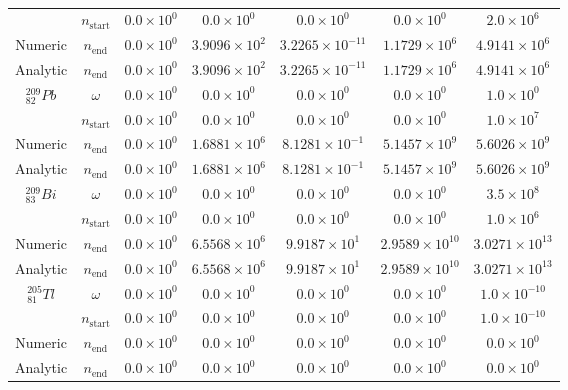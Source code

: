 \begin{table}[h]
\begin{center}
\begin{longtable}{c c c c c c c}
 & $n_{\text{start}}$ & 
${0.0} \times 10^{0}$ & ${0.0} \times 10^{0}$ & ${0.0} \times 10^{0}$ &
${0.0} \times 10^{0}$ & ${2.0} \times 10^{6}$ \\
Numeric & $n_{\text{end}}$ & 
${0.0} \times 10^{0}$ & ${3.9096} \times 10^{2}$ & ${3.2265} \times 10^{-11}$ & 
${1.1729} \times 10^{6}$ & ${4.9141} \times 10^{6}$ \\
Analytic & $n_{\text{end}}$ & 
${0.0} \times 10^{0}$ & ${3.9096} \times 10^{2}$ & ${3.2265} \times 10^{-11}$ & 
${1.1729} \times 10^{6}$ & ${4.9141} \times 10^{6}$ \\
\hline
${}^{209}_{82}Pb$ & $\omega$ & 
${0.0} \times 10^{0}$ & ${0.0} \times 10^{0}$ & ${0.0} \times 10^{0}$ &
${0.0} \times 10^{0}$ & ${1.0} \times 10^{0}$ \\
 & $n_{\text{start}}$ & 
${0.0} \times 10^{0}$ & ${0.0} \times 10^{0}$ & ${0.0} \times 10^{0}$ &
${0.0} \times 10^{0}$ & ${1.0} \times 10^{7}$ \\
Numeric & $n_{\text{end}}$ & 
${0.0} \times 10^{0}$ & ${1.6881} \times 10^{6}$ & ${8.1281} \times 10^{-1}$ & 
${5.1457} \times 10^{9}$ & ${5.6026} \times 10^{9}$ \\
Analytic & $n_{\text{end}}$ & 
${0.0} \times 10^{0}$ & ${1.6881} \times 10^{6}$ & ${8.1281} \times 10^{-1}$ & 
${5.1457} \times 10^{9}$ & ${5.6026} \times 10^{9}$ \\
\hline
${}^{209}_{83}Bi$ & $\omega$ & 
${0.0} \times 10^{0}$ & ${0.0} \times 10^{0}$ & ${0.0} \times 10^{0}$ &
${0.0} \times 10^{0}$ & ${3.5} \times 10^{8}$ \\
 & $n_{\text{start}}$ & 
${0.0} \times 10^{0}$ & ${0.0} \times 10^{0}$ & ${0.0} \times 10^{0}$ &
${0.0} \times 10^{0}$ & ${1.0} \times 10^{6}$ \\
Numeric & $n_{\text{end}}$ & 
${0.0} \times 10^{0}$ & ${6.5568} \times 10^{6}$ & ${9.9187} \times 10^{1}$ & 
${2.9589} \times 10^{10}$ & ${3.0271} \times 10^{13}$ \\
Analytic & $n_{\text{end}}$ & 
${0.0} \times 10^{0}$ & ${6.5568} \times 10^{6}$ & ${9.9187} \times 10^{1}$ & 
${2.9589} \times 10^{10}$ & ${3.0271} \times 10^{13}$ \\
\hline
${}^{205}_{81}Tl$ & $\omega$ & 
${0.0} \times 10^{0}$ & ${0.0} \times 10^{0}$ & ${0.0} \times 10^{0}$ &
${0.0} \times 10^{0}$ & ${1.0} \times 10^{-10}$ \\
 & $n_{\text{start}}$ & 
${0.0} \times 10^{0}$ & ${0.0} \times 10^{0}$ & ${0.0} \times 10^{0}$ &
${0.0} \times 10^{0}$ & ${1.0} \times 10^{-10}$ \\
Numeric & $n_{\text{end}}$ & 
${0.0} \times 10^{0}$ & ${0.0} \times 10^{0}$ & ${0.0} \times 10^{0}$ & 
${0.0} \times 10^{0}$ & ${0.0} \times 10^{0}$ \\
Analytic & $n_{\text{end}}$ & 
${0.0} \times 10^{0}$ & ${0.0} \times 10^{0}$ & ${0.0} \times 10^{0}$ & 
${0.0} \times 10^{0}$ & ${0.0} \times 10^{0}$ \\
\hline\hline
\end{longtable}
\end{center}
\caption{}
\label{table:bi213trialdata}
\end{table}




